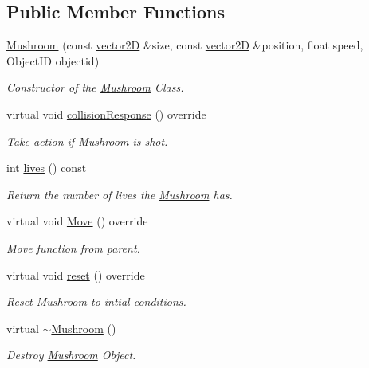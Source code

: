 \subsection*{Public Member Functions}
\begin{DoxyCompactItemize}
\item 
\mbox{\hyperlink{class_mushroom_afa955bb8eaaddc45571725b3e04c4c09}{Mushroom}} (const \mbox{\hyperlink{classvector2_d}{vector2D}} \&size, const \mbox{\hyperlink{classvector2_d}{vector2D}} \&position, float speed, Object\+ID objectid)
\begin{DoxyCompactList}\small\item\em Constructor of the \mbox{\hyperlink{class_mushroom}{Mushroom}} Class. \end{DoxyCompactList}\item 
\mbox{\label{class_mushroom_aa8d02f56dc9de6e73f61f8b68f8db5da}} 
virtual void \mbox{\hyperlink{class_mushroom_aa8d02f56dc9de6e73f61f8b68f8db5da}{collision\+Response}} () override
\begin{DoxyCompactList}\small\item\em Take action if \mbox{\hyperlink{class_mushroom}{Mushroom}} is shot. \end{DoxyCompactList}\item 
int \mbox{\hyperlink{class_mushroom_afe84a485e2eb67e1efadd49ef77cb79e}{lives}} () const
\begin{DoxyCompactList}\small\item\em Return the number of lives the \mbox{\hyperlink{class_mushroom}{Mushroom}} has. \end{DoxyCompactList}\item 
\mbox{\label{class_mushroom_a83ecffb484e4c3931e3dbd7eaa085e59}} 
virtual void \mbox{\hyperlink{class_mushroom_a83ecffb484e4c3931e3dbd7eaa085e59}{Move}} () override
\begin{DoxyCompactList}\small\item\em Move function from parent. \end{DoxyCompactList}\item 
\mbox{\label{class_mushroom_a9801ad2b960bee6bf66851434ba64b21}} 
virtual void \mbox{\hyperlink{class_mushroom_a9801ad2b960bee6bf66851434ba64b21}{reset}} () override
\begin{DoxyCompactList}\small\item\em Reset \mbox{\hyperlink{class_mushroom}{Mushroom}} to intial conditions. \end{DoxyCompactList}\item 
\mbox{\label{class_mushroom_a0cf0e035c2fcc711a4ae378eafa59fab}} 
virtual \mbox{\hyperlink{class_mushroom_a0cf0e035c2fcc711a4ae378eafa59fab}{$\sim$\+Mushroom}} ()
\begin{DoxyCompactList}\small\item\em Destroy \mbox{\hyperlink{class_mushroom}{Mushroom}} Object. \end{DoxyCompactList}\end{DoxyCompactItemize}
